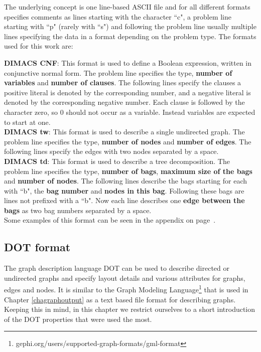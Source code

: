 \documentclass[a4paper, 12pt, bibliography=totoc]{scrartcl}
\begin{document}
The underlying concept is one line-based ASCII file and for all different formats specifies comments as lines starting with the character ``c", a problem line starting with ``p" (rarely with ``s") and following the problem line usually multiple lines specifying the data in a format depending on the problem type.
The formats used for this work are:

\textbf{DIMACS CNF}: This format is used to define a Boolean expression, written in conjunctive normal form. The problem line specifies the type, \textbf{number of variables} and \textbf{number of clauses}. The following lines specify the clauses a positive literal is denoted by the corresponding number, and a negative literal is denoted by the corresponding negative number. Each clause is followed by the character zero, so 0 should not occur as a variable. Instead variables are expected to start at one.\\

\textbf{DIMACS tw}: This format is used to describe a single undirected graph. The problem line specifies the type, \textbf{number of nodes} and \textbf{number of edges}. The following lines specify the edges with two nodes separated by a space.\\

\textbf{DIMACS td}: This format is used to describe a tree decomposition. The problem line specifies the type, \textbf{number of bags}, \textbf{maximum size of the bags} and \textbf{number of nodes}. The following lines describe the bags starting for each with ``b", the \textbf{bag number} and \textbf{nodes in this bag}. Following these bags are lines not prefixed with a ``b". Now each line describes one \textbf{edge between the bags} as two bag numbers separated by a space.\\


Some examples of this format can be seen in the appendix on page~\pageref{app:input}.

\subsection{DOT format}
The graph description language DOT can be used to describe directed or undirected graphs and specify layout details and various attributes for graphs, edges and nodes. It is similar to the Graph Modeling Language\footnote{gephi.org/users/supported-graph-formats/gml-format} that is used in Chapter \ref{chagraphoutput} as a text based file format for describing graphs. Keeping this in mind, in this chapter we restrict ourselves to a short introduction of the DOT properties that were used the most.
\end{document}
